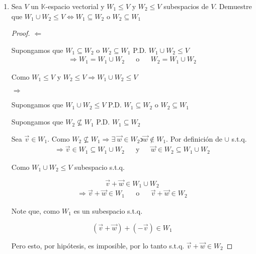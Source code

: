 \documentclass[12pt]{article}
\newcommand\K{\ensuremath{\mathbb{K}}}
\begin{document}
\begin{enumerate} 

\item Sea $V$ un $\K$-espacio vectorial y $W_1 \leq V$ y $W_2 \leq V$ subespacios de $V$. Demuestre que $W_1 \cup W_2 \leq V \Leftrightarrow W_1 \subseteq W_2$ o $W_2 \subseteq W_1$

\begin{proof}

    $\Leftarrow$

    Supongamos que $W_1 \subseteq W_2$ o $W_2 \subseteq W_1$ P.D. $W_1 \cup W_2 \leq V$
    \begin{align*}
          \Rightarrow  W_1 = W_1 \cup W_2   & & \text{o} & &  W_2 = W_1 \cup W_2 
    \end{align*}

    Como $W_1 \leq V$ y $W_2 \leq V \Rightarrow W_1 \cup W_2 \leq V$

    $\Rightarrow$

    Supongamos que $W_1 \cup W_2 \leq V$ P.D.  $W_1 \subseteq W_2$ o $W_2 \subseteq W_1$

    Supongamos que $W_2 \nsubseteq W_1$ P.D. $W_1 \subseteq W_2$ 
    
    Sea $\vec{v} \in W_1$. Como  $W_2 \nsubseteq W_1 \Rightarrow \exists \: \vec{w} \in W_2 \backepsilon \vec{w} \notin W_1 $. Por definición de $\cup$ s.t.q.
    \begin{align*}
          \Rightarrow  \vec{v} \in W_1 \subseteq  W_1 \cup W_2  & & \text{y} & &  \vec{w} \in W_2 \subseteq  W_1 \cup W_2 
    \end{align*}

    Como $W_1 \cup W_2  \leq V$ subespacio s.t.q.


    \begin{equation*}
        \vec{v} + \vec{w} \in W_1 \cup W_2
    \end{equation*}
    \begin{align*}
          \Rightarrow  \vec{v} + \vec{w} \in W_1  & & \text{o} & &  \vec{v} + \vec{w} \in W_2
    \end{align*}

    Note que, como $W_1$ es un subespacio s.t.q.

    \begin{equation*}
        (\vec{v} + \vec{w}) + (-\vec{v} ) \in W_1
    \end{equation*}

    Pero esto, por hipótesis, es imposible, por lo tanto s.t.q. $\vec{v} + \vec{w} \in W_2$


\end{proof}
\end{enumerate}
\end{document}
